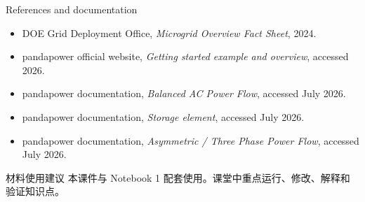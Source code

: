 \documentclass[aspectratio=169,10pt]{ctexbeamer}
\begin{document}
\begin{frame}{References and documentation}
\footnotesize
\begin{itemize}
  \item DOE Grid Deployment Office, \emph{Microgrid Overview Fact Sheet}, 2024.
  \item pandapower official website, \emph{Getting started example and overview}, accessed 2026.
  \item pandapower documentation, \emph{Balanced AC Power Flow}, accessed July 2026.
  \item pandapower documentation, \emph{Storage element}, accessed July 2026.
  \item pandapower documentation, \emph{Asymmetric / Three Phase Power Flow}, accessed July 2026.
\end{itemize}
\vspace{0.8em}
\begin{block}{材料使用建议}
本课件与 Notebook 1 配套使用。课堂中重点运行、修改、解释和验证知识点。
\end{block}
\end{frame}
\end{document}
